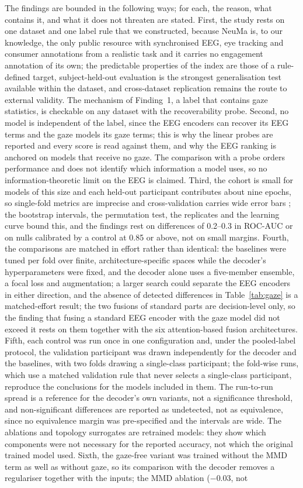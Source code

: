 \documentclass[pdflatex,sn-basic,Numbered,twocolumn,iicol]{sn-jnl}
\theoremstyle{thmstyleone}%
\theoremstyle{thmstyletwo}%
\theoremstyle{thmstylethree}%
\begin{document}
The findings are bounded in the following ways; for each, the reason, what contains it, and what it does not threaten are stated. First, the study rests on one dataset and one label rule that we constructed, because NeuMa is, to our knowledge, the only public resource with synchronised EEG, eye tracking and consumer annotations from a realistic task and it carries no engagement annotation of its own; the predictable properties of the index are those of a rule-defined target, subject-held-out evaluation is the strongest generalisation test available within the dataset, and cross-dataset replication remains the route to external validity. The mechanism of Finding~1, a label that contains gaze statistics, is checkable on any dataset with the recoverability probe. Second, no model is independent of the label, since the EEG encoders can recover its EEG terms and the gaze models its gaze terms; this is why the linear probes are reported and every score is read against them, and why the EEG ranking is anchored on models that receive no gaze. The comparison with a probe orders performance and does not identify which information a model uses, so no information-theoretic limit on the EEG is claimed. Third, the cohort is small for models of this size and each held-out participant contributes about nine epochs, so single-fold metrics are imprecise and cross-validation carries wide error bars \cite{ref63}; the bootstrap intervals, the permutation test, the replicates and the learning curve bound this, and the findings rest on differences of 0.2--0.3 in ROC-AUC or on nulls calibrated by a control at 0.85 or above, not on small margins. Fourth, the comparisons are matched in effort rather than identical: the baselines were tuned per fold over finite, architecture-specific spaces while the decoder's hyperparameters were fixed, and the decoder alone uses a five-member ensemble, a focal loss and augmentation; a larger search could separate the EEG encoders in either direction, and the absence of detected differences in Table~\ref{tab:gaze} is a matched-effort result; the two fusions of standard parts are decision-level only, so the finding that fusing a standard EEG encoder with the gaze model did not exceed it rests on them together with the six attention-based fusion architectures. Fifth, each control was run once in one configuration and, under the pooled-label protocol, the validation participant was drawn independently for the decoder and the baselines, with two folds drawing a single-class participant; the fold-wise runs, which use a matched validation rule that never selects a single-class participant, reproduce the conclusions for the models included in them. The run-to-run spread is a reference for the decoder's own variants, not a significance threshold, and non-significant differences are reported as undetected, not as equivalence, since no equivalence margin was pre-specified and the intervals are wide. The ablations and topology surrogates are retrained models: they show which components were not necessary for the reported accuracy, not which the original trained model used. Sixth, the gaze-free variant was trained without the MMD term as well as without gaze, so its comparison with the decoder removes a regulariser together with the inputs; the MMD ablation ($-0.03$, not 
\end{document}
